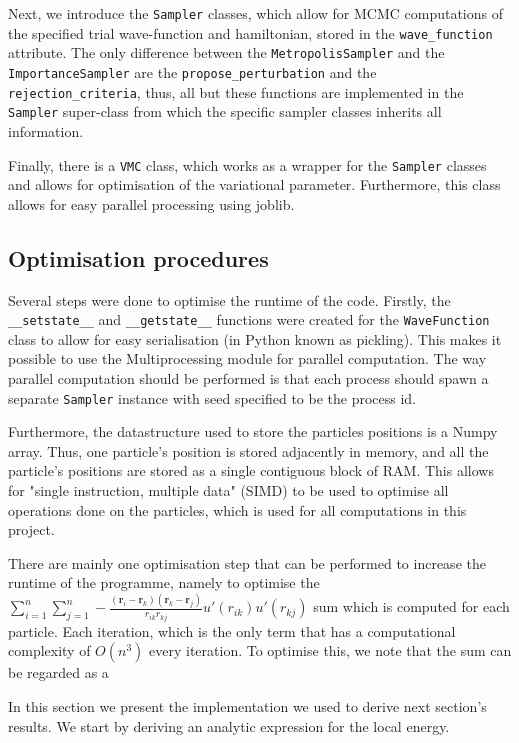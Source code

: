 \documentclass[11pt,a4paper]{article}
\numberwithin{equation}{section}
\begin{document}
Next, we introduce the \texttt{Sampler} classes, which allow for MCMC computations of the specified trial wave-function and hamiltonian, stored in the \texttt{wave\_function} attribute. The only difference between the \texttt{MetropolisSampler} and the \texttt{ImportanceSampler} are the \texttt{propose\_perturbation} and the \texttt{rejection\_criteria}, thus, all but these functions are implemented in the \texttt{Sampler} super-class from which the specific sampler classes inherits all information.

Finally, there is a \texttt{VMC} class, which works as a wrapper for the \texttt{Sampler} classes and allows for optimisation of the variational parameter. Furthermore, this class allows for easy parallel processing using joblib.

\subsection{Optimisation procedures}
Several steps were done to optimise the runtime of the code. Firstly, the \texttt{__setstate__} and \texttt{__getstate__} functions were created for the \texttt{WaveFunction} class to allow for easy serialisation (in Python known as pickling). This makes it possible to use the Multiprocessing module for parallel computation. The way parallel computation should be performed is that each process should spawn a separate \texttt{Sampler} instance with seed specified to be the process id.

Furthermore, the datastructure used to store the particles positions is a Numpy array. Thus, one particle's position is stored adjacently in memory, and all the particle's positions are stored as a single contiguous block of RAM. This allows for "single instruction, multiple data" (SIMD) to be used to optimise all operations done on the particles, which is used for all computations in this project.

There are mainly one optimisation step that can be performed to increase the runtime of the programme, namely to optimise the $\sum_{i=1}^n \sum_{j=1}^n -\frac{(\bm{r}_i - \bm{r}_k)(\bm{r}_k - \bm{r}_j)}{r_{ik}r_{kj}}u'(r_{ik})u'(r_{kj})$ sum which is computed for each particle. Each iteration, which is the only term that has a computational complexity of $O(n^3)$ every iteration. To optimise this, we note that the sum can be regarded as a 


In this section we present the implementation we used to derive next section's results. 
%
We start by deriving an analytic expression for the local energy. 
\end{document}
